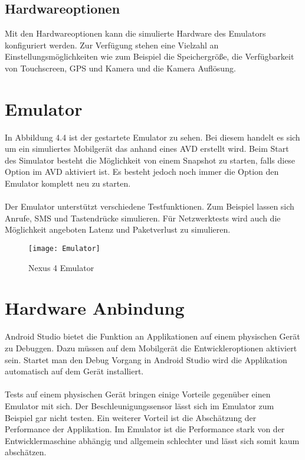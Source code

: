 \subsection{Hardwareoptionen}
Mit den Hardwareoptionen kann die simulierte Hardware des Emulators konfiguriert werden. Zur Verfügung stehen eine Vielzahl an Einstellungsmöglichkeiten wie zum Beispiel die Speichergröße, die Verfügbarkeit von Touchscreen, GPS und Kamera und die Kamera Auflösung.\cite{45}


\section{Emulator}
In Abbildung 4.4 ist der gestartete Emulator zu sehen. Bei diesem handelt es sich um ein simuliertes Mobilgerät das anhand eines AVD erstellt wird. Beim Start des Simulator besteht die Möglichkeit von einem Snapshot zu starten, falls diese Option im AVD aktiviert ist. Es besteht jedoch noch immer die Option den Emulator komplett neu zu starten.\cite{46}
\\
\\
Der Emulator unterstützt verschiedene Testfunktionen. Zum Beispiel lassen sich Anrufe, SMS und Tastendrücke simulieren. Für Netzwerktests wird auch die Möglichkeit angeboten Latenz und Paketverlust zu simulieren.\cite{46}

\begin{figure}
\centering
\texttt{[image: Emulator]}
\caption{Nexus 4 Emulator}
\label{fig:Emulator}
\end{figure}


\section{Hardware Anbindung}
Android Studio bietet die Funktion an Applikationen auf einem physischen Gerät zu Debuggen. Dazu müssen auf dem Mobilgerät die Entwickleroptionen aktiviert sein. Startet man den Debug Vorgang in Android Studio wird die Applikation automatisch auf dem Gerät installiert.\cite{47}
\\
\\
Tests auf einem physischen Gerät bringen einige Vorteile gegenüber einen Emulator mit sich. Der Beschleunigungssensor lässt sich im Emulator zum Beispiel gar nicht testen. Ein weiterer Vorteil ist die Abschätzung der Performance der Applikation. Im Emulator ist die Performance stark von der Entwicklermaschine abhängig und allgemein schlechter und lässt sich somit kaum abschätzen.\cite{47}